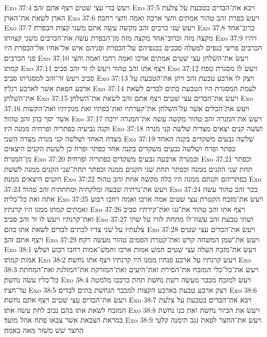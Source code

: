 Exo 37:4  ויעשׂ בדי עצי שׁטים ויצף אתם זהב׃
Exo 37:5  ויבא את־הבדים בטבעת על צלעת הארן לשׂאת את־הארן׃
Exo 37:6  ויעשׂ כפרת זהב טהור אמתים וחצי ארכה ואמה וחצי רחבה׃
Exo 37:7  ויעשׂ שׁני כרבים זהב מקשׁה עשׂה אתם משׁני קצות הכפרת׃
Exo 37:8  כרוב־אחד מקצה מזה וכרוב־אחד מקצה מזה מן־הכפרת עשׂה את־הכרבים משׁני קצוותו׃
Exo 37:9  ויהיו הכרבים פרשׂי כנפים למעלה סככים בכנפיהם על־הכפרת ופניהם אישׁ אל־אחיו אל־הכפרת היו פני הכרבים׃
Exo 37:10  ויעשׂ את־השׁלחן עצי שׁטים אמתים ארכו ואמה רחבו ואמה וחצי קמתו׃
Exo 37:11  ויצף אתו זהב טהור ויעשׂ לו זר זהב סביב׃
Exo 37:12  ויעשׂ לו מסגרת טפח סביב ויעשׂ זר־זהב למסגרתו סביב׃
Exo 37:13  ויצק לו ארבע טבעת זהב ויתן את־הטבעת על ארבע הפאת אשׁר לארבע רגליו׃
Exo 37:14  לעמת המסגרת היו הטבעת בתים לבדים לשׂאת את־השׁלחן׃
Exo 37:15  ויעשׂ את־הבדים עצי שׁטים ויצף אתם זהב לשׂאת את־השׁלחן׃
Exo 37:16  ויעשׂ את־הכלים אשׁר על־השׁלחן את־קערתיו ואת־כפתיו ואת מנקיתיו ואת־הקשׂות אשׁר יסך בהן זהב טהור׃
Exo 37:17  ויעשׂ את־המנרה זהב טהור מקשׁה עשׂה את־המנרה ירכה וקנה גביעיה כפתריה ופרחיה ממנה היו׃
Exo 37:18  ושׁשׁה קנים יצאים מצדיה שׁלשׁה קני מנרה מצדה האחד ושׁלשׁה קני מנרה מצדה השׁני׃
Exo 37:19  שׁלשׁה גבעים משׁקדים בקנה האחד כפתר ופרח ושׁלשׁה גבעים משׁקדים בקנה אחד כפתר ופרח כן לשׁשׁת הקנים היצאים מן־המנרה׃
Exo 37:20  ובמנרה ארבעה גבעים משׁקדים כפתריה ופרחיה׃
Exo 37:21  וכפתר תחת שׁני הקנים ממנה וכפתר תחת שׁני הקנים ממנה וכפתר תחת־שׁני הקנים ממנה לשׁשׁת הקנים היצאים ממנה׃
Exo 37:22  כפתריהם וקנתם ממנה היו כלה מקשׁה אחת זהב טהור׃
Exo 37:23  ויעשׂ את־נרתיה שׁבעה ומלקחיה ומחתתיה זהב טהור׃
Exo 37:24  ככר זהב טהור עשׂה אתה ואת כל־כליה׃
Exo 37:25  ויעשׂ את־מזבח הקטרת עצי שׁטים אמה ארכו ואמה רחבו רבוע ואמתים קמתו ממנו היו קרנתיו׃
Exo 37:26  ויצף אתו זהב טהור את־גגו ואת־קירתיו סביב ואת־קרנתיו ויעשׂ לו זר זהב סביב׃
Exo 37:27  ושׁתי טבעת זהב עשׂה־לו מתחת לזרו על שׁתי צלעתיו על שׁני צדיו לבתים לבדים לשׂאת אתו בהם׃
Exo 37:28  ויעשׂ את־הבדים עצי שׁטים ויצף אתם זהב׃
Exo 37:29  ויעשׂ את־שׁמן המשׁחה קדשׁ ואת־קטרת הסמים טהור מעשׂה רקח׃
Exo 38:1  ויעשׂ את־מזבח העלה עצי שׁטים חמשׁ אמות ארכו וחמשׁ־אמות רחבו רבוע ושׁלשׁ אמות קמתו׃
Exo 38:2  ויעשׂ קרנתיו על ארבע פנתיו ממנו היו קרנתיו ויצף אתו נחשׁת׃
Exo 38:3  ויעשׂ את־כל־כלי המזבח את־הסירת ואת־היעים ואת־המזרקת את־המזלגת ואת־המחתת כל־כליו עשׂה נחשׁת׃
Exo 38:4  ויעשׂ למזבח מכבר מעשׂה רשׁת נחשׁת תחת כרכבו מלמטה עד־חציו׃
Exo 38:5  ויצק ארבע טבעת בארבע הקצות למכבר הנחשׁת בתים לבדים׃
Exo 38:6  ויעשׂ את־הבדים עצי שׁטים ויצף אתם נחשׁת׃
Exo 38:7  ויבא את־הבדים בטבעת על צלעת המזבח לשׂאת אתו בהם נבוב לחת עשׂה אתו׃
Exo 38:8  ויעשׂ את הכיור נחשׁת ואת כנו נחשׁת במראת הצבאת אשׁר צבאו פתח אהל מועד׃
Exo 38:9  ויעשׂ את־החצר לפאת נגב תימנה קלעי החצר שׁשׁ משׁזר מאה באמה׃
